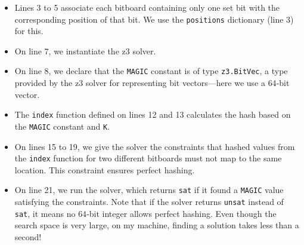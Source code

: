 \documentclass[12pt,a4paper,twoside,openright]{book}
\begin{document}
\begin{itemize}

\item Lines 3 to 5 associate each bitboard containing only one set bit with the corresponding position of that bit. We use the \texttt{positions} dictionary (line 3) for this.

\item On line 7, we instantiate the \gls{z3} solver.

\item On line 8, we declare that the \texttt{MAGIC} constant is of type \texttt{z3.BitVec}, a type provided by the \gls{z3} solver for representing bit vectors—here we use a $64$-bit vector.

\item The \texttt{index} function defined on lines 12 and 13 calculates the hash based on the \texttt{MAGIC} constant and \texttt{K}.

\item On lines 15 to 19, we give the solver the constraints that hashed values from the \texttt{index} function for two different bitboards must not map to the same location. This constraint ensures perfect hashing.

\item On line 21, we run the solver, which returns \texttt{sat} if it found a \texttt{MAGIC} value satisfying the constraints. Note that if the solver returns \texttt{unsat} instead of \texttt{sat}, it means no $64$-bit integer allows perfect hashing. Even though the search space is very large, on my machine, finding a solution takes less than a second!


\end{itemize}
\end{document}
